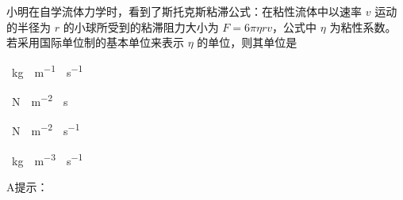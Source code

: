 小明在自学流体力学时，看到了斯托克斯粘滞公式：在粘性流体中以速率 \(v\) 运动的半径为 \(r\) 的小球所受到的粘滞阻力大小为 \(F = 6\pi \eta r v\)，公式中 \(\eta\) 为粘性系数。若采用国际单位制的基本单位来表示 \(\eta\) 的单位，则其单位是\paren[]
\begin{choices}
	\item \qty{}{kg\cdot m^{-1}\cdot s^{-1}}
	\item \qty{}{N\cdot m^{-2}\cdot s}
	\item \qty{}{N\cdot m^{-2}\cdot s^{-1}}
	\item \qty{}{kg\cdot m^{-3}\cdot s^{-1}}
\end{choices}
\begin{answer}
    A\qquad 提示：
\end{answer}